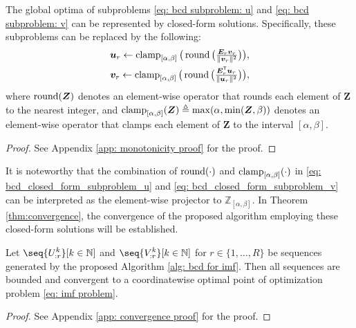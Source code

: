 \begin{theorem} \label{the: bcd subproblem}
    The global optima of subproblems \eqref{eq: bcd subproblem: u} and \eqref{eq: bcd subproblem: v} can be represented by closed-form solutions. Specifically, these subproblems can be replaced by the following:
    \begin{align} 
            \textstyle \bm{u}_r \gets \operatorname{clamp}_{[\alpha,\beta]}\big(\operatorname{round}\big(\frac{\bm{E}_r \bm{v}_r}{\lVert \bm{v}_r \rVert^2}\big)\big), \label{eq: bcd_closed_form_subproblem_u}\\
            \textstyle \bm{v}_r \gets \operatorname{clamp}_{[\alpha,\beta]}\big(\operatorname{round}\big(\frac{\bm{E}_r^\mathsf{T} \bm{u}_r}{\lVert \bm{u}_r \rVert^2}\big)\big),             
        \label{eq: bcd_closed_form_subproblem_v}
    \end{align}
    where $\operatorname{round}(\bm{Z})$ denotes an element-wise operator that rounds each element of $\bm{Z}$ to the nearest integer, and $\operatorname{clamp}_{[\alpha,\beta]}(\bm{Z}) \triangleq \max(\alpha, \min(\bm{Z}, \beta))$ denotes an element-wise operator that clamps each element of $\bm{Z}$ to the interval $[\alpha,\beta]$.
\end{theorem}
\begin{proof}
	See Appendix \ref{app: monotonicity proof} for the proof.
\end{proof}

It is noteworthy that the combination of $\operatorname{round}(\cdot)$ and $\operatorname{clamp}_{[\alpha,\beta]}(\cdot)$ in \eqref{eq: bcd_closed_form_subproblem_u} and \eqref{eq: bcd_closed_form_subproblem_v} can be interpreted as the element-wise projector to $\mathbb{Z}_{[\alpha,\beta]}$. In Theorem \ref{thm:convergence}, the convergence of the proposed algorithm employing these closed-form solutions will be established.

\begin{theorem}\label{thm:convergence}
    Let $\seq{\displaystyle U_{:r}^{k}}[k\in\N]$ and $\seq{\displaystyle V_{:r}^{k}}[k\in\N]$ for $r\in \{1,\dots,R\}$ be sequences generated by the proposed Algorithm \ref{alg: bcd for imf}. Then all sequences are bounded and convergent to a coordinatewise optimal point of optimization problem \eqref{eq: imf problem}.
\end{theorem}
\begin{proof}
    See Appendix \ref{app: convergence proof} for the proof.
\end{proof}




